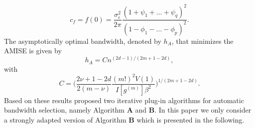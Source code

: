 \documentclass[12pt]{article}
\newtheorem{theorem}{Theorem}
\begin{document}
\begin{equation}
	c_f = f(0) = \frac{\sigma^2_\epsilon}{2\pi} \frac{(1 + \psi_1+\dots+\psi_q)^2}{(1-\phi_1-\dots-\phi_p)^2}.
\end{equation}
 The asymptotically optimal bandwidth, denoted by $h_A$, that minimizes the AMISE is given by
\begin{equation}
h_A=Cn^{(2d-1)/(2m+1-2d)},
\end{equation}
with 
\begin{equation}
C=\Bigg(\frac{2\nu+1-2d}{2(m-\nu)}\frac{(m!)^2V(1)}{I[g^{(m)}]\beta^2}\Bigg)^{1/(2m+1-2d)}.
\end{equation}
Based on these results \citet{beran2002iterative} proposed two iterative plug-in algorithms for automatic bandwidth selection, namely Algorithm \textbf{A} and \textbf{B}. In this paper we only consider a strongly adapted version of Algorithm \textbf{B} which is presented in the following.


 
%
\end{document}
